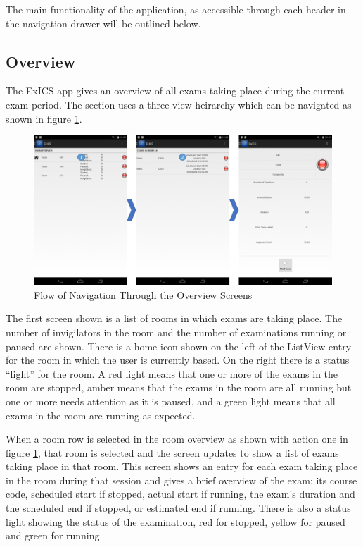 \FloatBarrier

The main functionality of the application, as accessible through each header in the navigation drawer will be outlined below.

\subsection{Overview}

The ExICS app gives an overview of all exams taking place during the current exam period.  The section uses a three view heirarchy which can be navigated as shown in figure \ref{fig:overview_flowchart}.

\FloatBarrier

\begin{figure}[!htpb]
	\centering
	\includegraphics[width=\textwidth]{"screenshots/overview_flowchart"}
	\caption{Flow of Navigation Through the Overview Screens}
	\label{fig:overview_flowchart}
\end{figure}

\FloatBarrier

The first screen shown is a list of rooms in which exams are taking place.  The number of invigilators in the room and the number of examinations running or paused are shown.  There is a home icon shown on the left of the ListView entry for the room in which the user is currently based.  On the right there is a status ``light'' for the room.  A red light means that one or more of the exams in the room are stopped, amber means that the exams in the room are all running but one or more needs attention as it is paused, and a green light means that all exams in the room are running as expected.

When a room row is selected in the room overview as shown with action one in figure \ref{fig:overview_flowchart}, that room is selected and the screen updates to show a list of exams taking place in that room.  This screen shows an entry for each exam taking place in the room during that session and gives a brief overview of the exam; its course code, scheduled start if stopped, actual start if running, the exam's duration and the scheduled end if stopped, or estimated end if running.  There is also a status light showing the status of the examination, red for stopped, yellow for paused and green for running.

